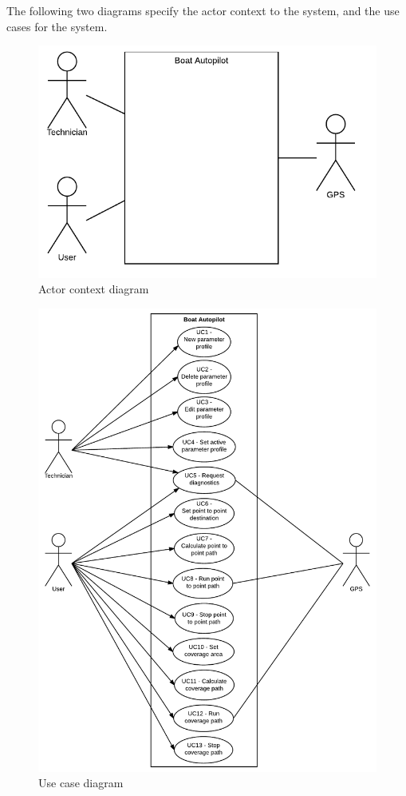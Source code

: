 The following two diagrams specify the actor context to the system, and the use cases for the system.

\begin{figure}[H]
	\centering
	\includegraphics{Images/Requirements_specification/Actor_context_diagram}
	\caption{Actor context diagram}
\end{figure}

\begin{figure}[H]
	\centering
	\includegraphics[width=0.9\linewidth]{Images/Requirements_specification/Usecase_diagram}
	\caption{Use case diagram}
	\label{fig:usecasediagram}
\end{figure}


